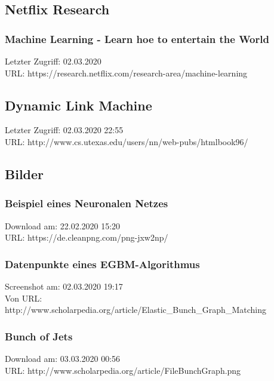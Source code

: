 \subsection{Netflix Research}
\label{Netlfix_Research}
	\subsubsection{Machine Learning - Learn hoe to entertain the World}
	\label{Netflix_Research:machine_learning_learn_how_to_entertain_the_world}
	Letzter Zugriff: 02.03.2020\\
	URL: https://research.netflix.com/research-area/machine-learning

\subsection{Dynamic Link Machine}
\label{subsec:dynamic_link_machine}
	Letzter Zugriff: 02.03.2020 22:55\\
	URL: http://www.cs.utexas.edu/users/nn/web-pubs/htmlbook96/

\subsection{Bilder}
\label{subsec:Bilder_Anhang}
	\subsubsection{Beispiel eines Neuronalen Netzes}
	\label{subsubsec:Beispiel_eines_Neuronalen_Netzes}
	Download am: 22.02.2020 15:20\\
	URL: https://de.cleanpng.com/png-jxw2np/

	\subsubsection{Datenpunkte eines EGBM-Algorithmus}
	\label{image:datapoints_of_a_EGBM_algoryhtm}
	Screenshot am: 02.03.2020 19:17\\
	Von URL: http://www.scholarpedia.org/article/Elastic\_Bunch\_Graph\_Matching

	\subsubsection{Bunch of Jets}
	\label{image:Bunch_of_jets}
		Download am: 03.03.2020 00:56\\
		URL: http://www.scholarpedia.org/article/File\:BunchGraph.png